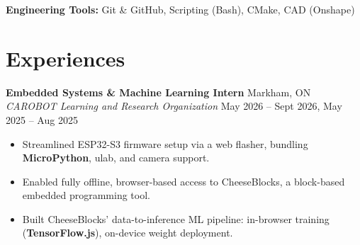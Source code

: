 \documentclass[10pt,letterpaper]{article}
\begin{document}
\hspace{0.75em}\textbf{Engineering Tools:} 
Git \& GitHub, Scripting (Bash), CMake, CAD (Onshape) \\








\section{Experiences}

\textbf{Embedded Systems \& Machine Learning Intern} \hfill
Markham, ON \\
\textit{CAROBOT Learning and Research Organization} \hfill 
May 2026 -- Sept 2026, May 2025 -- Aug 2025 \\
\begin{itemize}
    \item Streamlined ESP32-S3 firmware setup via a web flasher, bundling \textbf{MicroPython}, ulab, and camera support.
    \item Enabled fully offline, browser-based access to CheeseBlocks, a block-based embedded programming tool.
    \item Built CheeseBlocks' data-to-inference ML pipeline: in-browser training (\textbf{TensorFlow.js}), on-device weight deployment.
\end{itemize}
\end{document}
